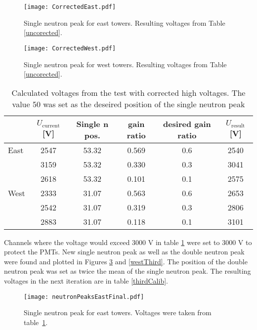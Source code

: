 \documentclass[a4paper,10pt]{article}
\begin{document}
\begin{figure}[htb]
\begin{center}
\texttt{[image: CorrectedEast.pdf]}
\end{center}
\caption{Single neutron peak for east towers. Resulting voltages from Table \ref{uncorected}.}
\label{eastPlot}
\end{figure}

\begin{figure}[htb]
\begin{center}
\texttt{[image: CorrectedWest.pdf]}
\end{center}
\caption{Single neutron peak for west towers. Resulting voltages from Table \ref{uncorected}.}
\label{westPlot}
\end{figure}

\begin{table}[htb] 
\caption{Calculated voltages from the test with corrected high voltages.
The value 50 was set as the deseired position of the single neutron peak}
\label{corected}
\begin{center}
\begin{tabular}{lccccc}
 \toprule
 &$U_\text{current}$[V]&Single n pos.&gain ratio&desired gain ratio&$U_\text{result}$[V]\\
\midrule
 East&2547&53.32&0.569&0.6&2540\\
     &3159&53.32&0.330&0.3&3041\\
     &2618&53.32&0.101&0.1&2575\\
 \midrule
West&2333&31.07&0.563&0.6&2653\\
    &2542&31.07&0.319&0.3&2806\\
    &2883&31.07&0.118&0.1&3101\\
 \bottomrule
\end{tabular}
\end{center}
\end{table}

Channels where the voltage would exceed 3000 V in table \ref{corected} were set to 3000 V to
protect the PMTs. New single neutron peak as well as the double neutron peak were found and
plotted in Figures \ref{eastThird}
and \ref{westThird}. The position of the double neutron peak was set as twice the mean
of the single neutron peak.
The resulting voltages in the next iteration are in table \ref{thirdCalib}.

\begin{figure}[htb]
\begin{center}
\texttt{[image: neutronPeaksEastFinal.pdf]}
\end{center}
\caption{Single neutron peak for east towers. Voltages were taken from table~\ref{corected}.}
\label{eastThird}
\end{figure}
\end{document}
